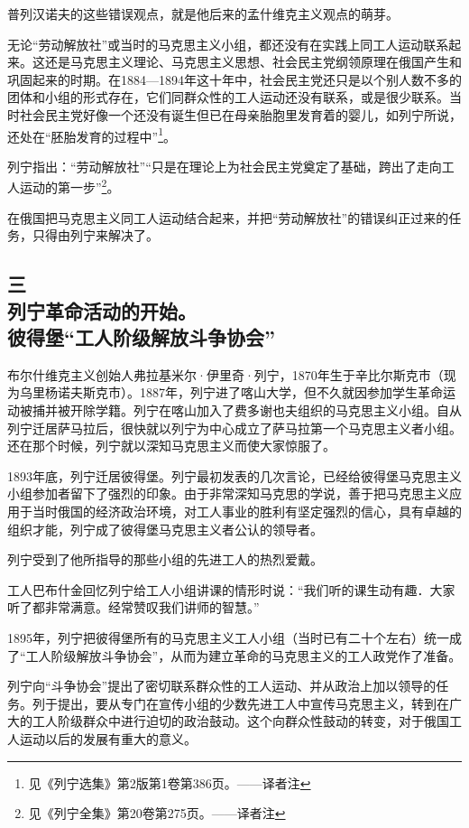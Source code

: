 普列汉诺夫的这些错误观点，就是他后来的孟什维克主义观点的萌芽。

无论“劳动解放社”或当时的马克思主义小组，都还没有在实践上同工人运动联系起来。这还是马克思主义理论、马克思主义思想、社会民主党纲领原理在俄国产生和巩固起来的时期。在1884—1894年这十年中，社会民主党还只是以个别人数不多的团体和小组的形式存在，它们同群众性的工人运动还没有联系，或是很少联系。当时社会民主党好像一个还没有诞生但已在母亲胎胞里发育着的婴儿，如列宁所说，还处在“胚胎发育的过程中”\footnote{见《列宁选集》第2版第1卷第386页。——译者注}。

列宁指出：“劳动解放社”“只是在理论上为社会民主党奠定了基础，跨出了走向工人运动的第一步”\footnote{见《列宁全集》第20卷第275页。——译者注}。

在俄国把马克思主义同工人运动结合起来，并把“劳动解放社”的错误纠正过来的任务，只得由列宁来解决了。


\subsection[三\q 列宁革命活动的开始。彼得堡“工人阶级解放斗争协会”]{三\\ 列宁革命活动的开始。\\ 彼得堡“工人阶级解放斗争协会”}

布尔什维克主义创始人弗拉基米尔·伊里奇·列宁，1870年生于辛比尔斯克市（现为乌里杨诺夫斯克市）。1887年，列宁进了喀山大学，但不久就因参加学生革命运动被捕并被开除学籍。列宁在喀山加入了费多谢也夫组织的马克思主义小组。自从列宁迁居萨马拉后，很快就以列宁为中心成立了萨马拉第一个马克思主义者小组。还在那个时候，列宁就以深知马克思主义而使大家惊服了。

1893年底，列宁迁居彼得堡。列宁最初发表的几次言论，已经给彼得堡马克思主义小组参加者留下了强烈的印象。由于非常深知马克思的学说，善于把马克思主义应用于当时俄国的经济政治环境，对工人事业的胜利有坚定强烈的信心，具有卓越的组织才能，列宁成了彼得堡马克思主义者公认的领导者。

列宁受到了他所指导的那些小组的先进工人的热烈爱戴。

工人巴布什金回忆列宁给工人小组讲课的情形时说：“我们听的课生动有趣．大家听了都非常满意。经常赞叹我们讲师的智慧。”

1895年，列宁把彼得堡所有的马克思主义工人小组（当时已有二十个左右）统一成了“工人阶级解放斗争协会”，从而为建立革命的马克思主义的工人政党作了准备。

列宁向“斗争协会”提出了密切联系群众性的工人运动、并从政治上加以领导的任务。列于提出，要从专门在宣传小组的少数先进工人中宣传马克思主义，转到在广大的工人阶级群众中进行迫切的政治鼓动。这个向群众性鼓动的转变，对于俄国工人运动以后的发展有重大的意义。

